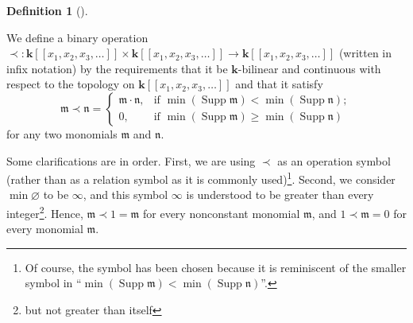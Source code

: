 \documentclass[numbers=enddot,12pt,final,onecolumn,notitlepage,abstracton]{scrartcl}%
\theoremstyle{definition}
\newtheorem{defi}[theo]{Definition}
\newenvironment{definition}[1][]
{\begin{defi}[#1]\begin{leftbar}}
{\end{leftbar}\end{defi}}
\begin{document}
\begin{definition}
\label{def.Dless}We define a binary operation $\left.  \prec\right.
:\mathbf{k}\left[  \left[  x_{1},x_{2},x_{3},\ldots\right]  \right]
\times\mathbf{k}\left[  \left[  x_{1},x_{2},x_{3},\ldots\right]  \right]
\rightarrow\mathbf{k}\left[  \left[  x_{1},x_{2},x_{3},\ldots\right]  \right]
$ (written in infix notation\footnotemark) by the requirements that it be
$\mathbf{k}$-bilinear and continuous with respect to the topology on
$\mathbf{k}\left[  \left[  x_{1},x_{2},x_{3},\ldots\right]  \right]  $ and
that it satisfy%
\begin{equation}
\mathfrak{m}\left.  \prec\right.  \mathfrak{n}=
\begin{cases}
\mathfrak{m}\cdot\mathfrak{n}, & \text{if }\min\left(  \operatorname*{Supp}%
\mathfrak{m}\right)  <\min\left(  \operatorname*{Supp}\mathfrak{n}\right)  ;\\
0, & \text{if }\min\left(  \operatorname*{Supp}\mathfrak{m}\right)  \geq
\min\left(  \operatorname*{Supp}\mathfrak{n}\right)
\end{cases}
\label{eq.def.Dless.monomial}%
\end{equation}
for any two monomials $\mathfrak{m}$ and $\mathfrak{n}$.
\end{definition}

Some clarifications are in
order. First, we are using $\left.  \prec\right.  $ as an operation symbol
(rather than as a relation symbol as it is commonly used)\footnote{Of course,
the symbol has been chosen because it is reminiscent of the smaller symbol in
\textquotedblleft$\min\left(  \operatorname*{Supp}\mathfrak{m}\right)
<\min\left(  \operatorname*{Supp}\mathfrak{n}\right)  $\textquotedblright.}.
Second, we consider $\min\varnothing$ to be $\infty$, and this symbol $\infty$
is understood to be greater than every integer\footnote{but not greater than
itself}. Hence, $\mathfrak{m}\left.  \prec\right.  1=\mathfrak{m}$ for every
nonconstant monomial $\mathfrak{m}$, and $1\left.  \prec\right.
\mathfrak{m}=0$ for every monomial $\mathfrak{m}$.
\end{document}
